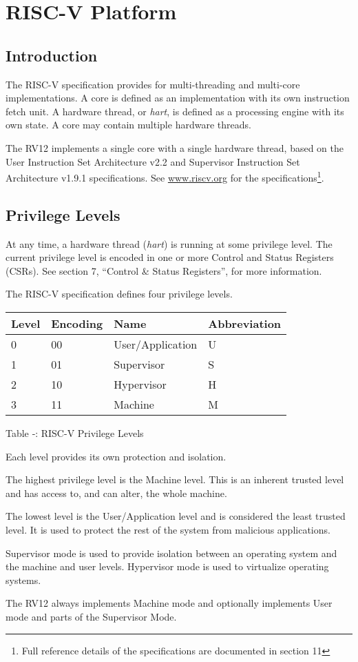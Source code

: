 \section{RISC-V Platform}\label{risc-v-platform}

\subsection{Introduction}\label{introduction-2}

The RISC-V specification provides for multi-threading and multi-core
implementations. A core is defined as an implementation with its own
instruction fetch unit. A hardware thread, or \emph{hart}, is defined as
a processing engine with its own state. A core may contain multiple
hardware threads.

The RV12 implements a single core with a single hardware thread, based
on the User Instruction Set Architecture v2.2 and Supervisor Instruction
Set Architecture v1.9.1 specifications. See
\href{http://www.riscv.org}{www.riscv.org} for the
specifications\footnote{Full reference details of the specifications are
  documented in section 11}.

\subsection{Privilege Levels}\label{privilege-levels}

At any time, a hardware thread (\emph{hart}) is running at some
privilege level. The current privilege level is encoded in one or more
Control and Status Registers (CSRs). See section 7, ``Control \& Status
Registers'', for more information.

The RISC-V specification defines four privilege levels.

\begin{longtable}[]{@{}llll@{}}
\toprule
Level & Encoding & Name & Abbreviation\tabularnewline
\midrule
\endhead
0 & 00 & User/Application & U\tabularnewline
1 & 01 & Supervisor & S\tabularnewline
2 & 10 & Hypervisor & H\tabularnewline
3 & 11 & Machine & M\tabularnewline
\bottomrule
\end{longtable}

Table ‑: RISC-V Privilege Levels

Each level provides its own protection and isolation.

The highest privilege level is the Machine level. This is an inherent
trusted level and has access to, and can alter, the whole machine.

The lowest level is the User/Application level and is considered the
least trusted level. It is used to protect the rest of the system from
malicious applications.

Supervisor mode is used to provide isolation between an operating system
and the machine and user levels. Hypervisor mode is used to virtualize
operating systems.

The RV12 always implements Machine mode and optionally implements User
mode and parts of the Supervisor Mode.
